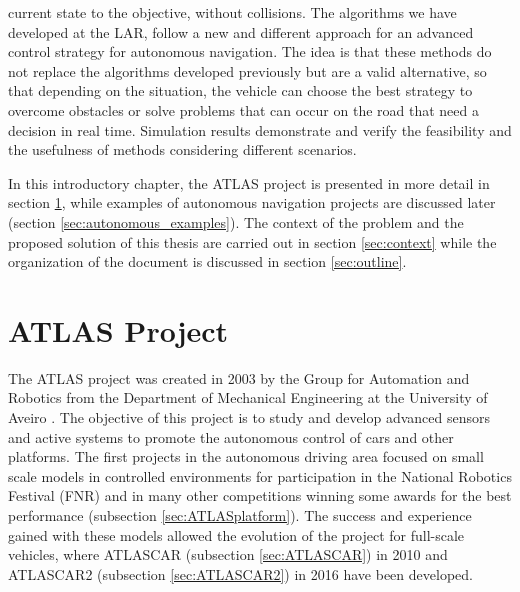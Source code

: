 current state to the objective, without collisions. The algorithms we have developed at the LAR, follow a new and different approach for an advanced control strategy for autonomous navigation. The idea is that these methods do not replace the algorithms developed previously but are a valid alternative, so that depending on the situation, the vehicle can choose the best strategy to overcome obstacles or solve problems that can occur on the road that need a decision in real time.  Simulation results demonstrate and verify the feasibility and the usefulness of methods considering different scenarios.

In this introductory chapter, the ATLAS project is presented in more detail in section \ref{sec:ATLAS}, while examples of autonomous navigation projects are discussed later (section \ref{sec:autonomous_examples}). The context of the problem and the proposed solution of this thesis are carried out in section \ref{sec:context} while the organization of the document is discussed in section \ref{sec:outline}.
\section{ATLAS Project}\label{sec:ATLAS}
The ATLAS project was created in 2003 by the Group for Automation and Robotics from the Department of Mechanical Engineering at the University of Aveiro \cite{vsantos2010}. The objective of this project is to study and develop advanced sensors and active systems to promote the autonomous control of cars and other platforms. The first projects in the autonomous driving area focused on small scale models in controlled environments for participation in the National Robotics Festival (FNR) and in many other competitions winning some awards for the best performance (subsection \ref{sec:ATLASplatform}). The success and experience gained with these models allowed the evolution of the project for full-scale vehicles, where ATLASCAR (subsection \ref{sec:ATLASCAR}) in 2010 and ATLASCAR2 (subsection \ref{sec:ATLASCAR2}) in 2016 have been developed.

